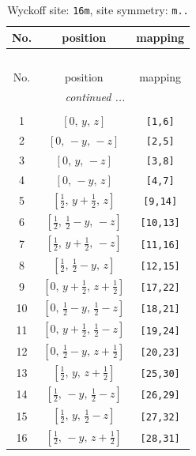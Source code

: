 \documentclass[fleqn,8pt]{jsarticle}
\begin{document}
\renewcommand{\arraystretch}{1.2}
\begin{longtable}{ccc}
\caption{Wyckoff site: {\tt 16m}, site symmetry: {\tt m..}}
 \\
 \hline \hline
No. & position & mapping \\ \hline \endfirsthead

\multicolumn{2}{l}{\tablename\ \thetable{}} \\
 \hline \hline
No. & position & mapping \\ \hline \endhead

 \hline \hline
\multicolumn{2}{r}{\footnotesize\it continued ...} \\ \endfoot

 \hline \hline
\multicolumn{2}{r}{} \\ \endlastfoot

1 & $\left[ 0,\, y,\, z \right]$ & {\tt [1,6]} \\ \hline
2 & $\left[ 0,\, - y,\, - z \right]$ & {\tt [2,5]} \\ \hline
3 & $\left[ 0,\, y,\, - z \right]$ & {\tt [3,8]} \\ \hline
4 & $\left[ 0,\, - y,\, z \right]$ & {\tt [4,7]} \\ \hline
5 & $\left[ \frac{1}{2},\, y + \frac{1}{2},\, z \right]$ & {\tt [9,14]} \\ \hline
6 & $\left[ \frac{1}{2},\, \frac{1}{2} - y,\, - z \right]$ & {\tt [10,13]} \\ \hline
7 & $\left[ \frac{1}{2},\, y + \frac{1}{2},\, - z \right]$ & {\tt [11,16]} \\ \hline
8 & $\left[ \frac{1}{2},\, \frac{1}{2} - y,\, z \right]$ & {\tt [12,15]} \\ \hline
9 & $\left[ 0,\, y + \frac{1}{2},\, z + \frac{1}{2} \right]$ & {\tt [17,22]} \\ \hline
10 & $\left[ 0,\, \frac{1}{2} - y,\, \frac{1}{2} - z \right]$ & {\tt [18,21]} \\ \hline
11 & $\left[ 0,\, y + \frac{1}{2},\, \frac{1}{2} - z \right]$ & {\tt [19,24]} \\ \hline
12 & $\left[ 0,\, \frac{1}{2} - y,\, z + \frac{1}{2} \right]$ & {\tt [20,23]} \\ \hline
13 & $\left[ \frac{1}{2},\, y,\, z + \frac{1}{2} \right]$ & {\tt [25,30]} \\ \hline
14 & $\left[ \frac{1}{2},\, - y,\, \frac{1}{2} - z \right]$ & {\tt [26,29]} \\ \hline
15 & $\left[ \frac{1}{2},\, y,\, \frac{1}{2} - z \right]$ & {\tt [27,32]} \\ \hline
16 & $\left[ \frac{1}{2},\, - y,\, z + \frac{1}{2} \right]$ & {\tt [28,31]} \\
\end{longtable}
\end{document}
